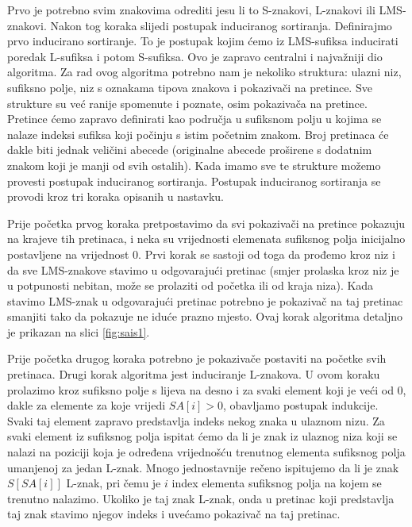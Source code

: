 Prvo je potrebno svim znakovima odrediti jesu li to S-znakovi, L-znakovi ili LMS-znakovi. Nakon tog koraka slijedi postupak induciranog sortiranja. Definirajmo prvo inducirano sortiranje. To je postupak kojim ćemo iz LMS-sufiksa inducirati poredak L-sufiksa i potom S-sufiksa. Ovo je zapravo centralni i najvažniji dio algoritma. Za rad ovog algoritma potrebno nam je nekoliko struktura: ulazni niz, sufiksno polje, niz s oznakama tipova znakova i pokazivači na pretince. Sve strukture su već ranije spomenute i poznate, osim pokazivača na pretince. Pretince ćemo zapravo definirati kao područja u sufiksnom polju u kojima se nalaze indeksi sufiksa koji počinju s  istim početnim znakom. Broj pretinaca će dakle biti jednak veličini abecede (originalne abecede proširene s dodatnim znakom koji je manji od svih ostalih). Kada imamo sve te strukture možemo provesti postupak induciranog sortiranja. Postupak induciranog sortiranja se provodi kroz tri koraka opisanih u nastavku.

Prije početka prvog koraka pretpostavimo da svi pokazivači na pretince pokazuju na krajeve tih pretinaca, i neka su vrijednosti elemenata sufiksnog polja inicijalno postavljene na vrijednost 0. Prvi korak se sastoji od toga da prođemo kroz niz i da sve LMS-znakove stavimo u odgovarajući pretinac (smjer prolaska kroz niz je u potpunosti nebitan, može se prolaziti od početka ili od kraja niza). Kada stavimo LMS-znak u odgovarajući pretinac potrebno je pokazivač na taj pretinac smanjiti tako da pokazuje ne iduće prazno mjesto. Ovaj korak algoritma detaljno je prikazan na slici \ref{fig:sais1}.


Prije početka drugog koraka potrebno je pokazivače postaviti na početke svih pretinaca. Drugi korak algoritma jest induciranje L-znakova. U ovom koraku prolazimo kroz sufiksno polje s lijeva na desno i za svaki element koji je veći od 0, dakle za elemente za koje vrijedi $SA[i]>0$, obavljamo postupak indukcije. Svaki taj  element zapravo predstavlja indeks nekog znaka u ulaznom nizu. Za svaki element iz sufiksnog polja ispitat ćemo da li je znak iz ulaznog niza koji se nalazi na poziciji koja je određena vrijednošću trenutnog elementa sufiksnog polja umanjenoj za jedan L-znak. Mnogo jednostavnije rečeno  ispitujemo da li je znak $S[SA[i]]$ L-znak, pri čemu je $i$ index elementa sufiksnog polja na kojem se trenutno nalazimo. Ukoliko je taj znak L-znak, onda u pretinac koji predstavlja taj znak stavimo njegov indeks i uvećamo pokazivač na taj pretinac. 



